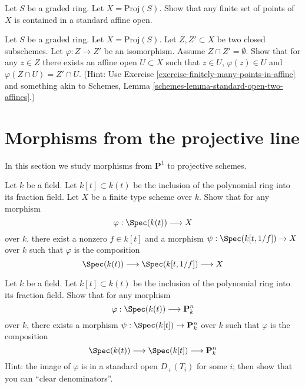 \begin{exercise}
\label{exercise-finitely-many-points-in-affine}
Let $S$ be a graded ring.
Let $X = \text{Proj}(S)$.
Show that any finite set of points of $X$ is contained in a standard
affine open.
\end{exercise}

\begin{exercise}
\label{exercise-prepare-glueing}
Let $S$ be a graded ring.
Let $X = \text{Proj}(S)$.
Let $Z, Z' \subset X$ be two closed subschemes.
Let $\varphi : Z \to Z'$ be an isomorphism.
Assume $Z \cap Z' = \emptyset$.
Show that for any $z \in Z$ there exists an affine
open $U \subset X$ such that $z \in U$, $\varphi(z) \in U$ and
$\varphi(Z \cap U) = Z' \cap U$.
(Hint: Use Exercise \ref{exercise-finitely-many-points-in-affine}
and something akin to
Schemes, Lemma \ref{schemes-lemma-standard-open-two-affines}.)
\end{exercise}







\section{Morphisms from the projective line}
\label{section-from-P1}

\noindent
In this section we study morphisms from $\mathbf{P}^1$
to projective schemes.

\begin{exercise}
\label{exercise-from-generic-point}
Let $k$ be a field. Let $k[t] \subset k(t)$ be the
inclusion of the polynomial ring into its fraction field.
Let $X$ be a finite type scheme over $k$.
Show that for any morphism
$$
\varphi : \Spec(k(t)) \longrightarrow X
$$
over $k$, there exist a nonzero $f \in k[t]$ and a morphism
$\psi : \Spec(k[t, 1/f]) \to X$ over $k$
such that $\varphi$ is the composition
$$
\Spec(k(t)) \longrightarrow \Spec(k[t, 1/f]) \longrightarrow X
$$
\end{exercise}

\begin{exercise}
\label{exercise-from-generic-point-Pn}
Let $k$ be a field. Let $k[t] \subset k(t)$ be the
inclusion of the polynomial ring into its fraction field.
Show that for any morphism
$$
\varphi : \Spec(k(t)) \longrightarrow \mathbf{P}^n_k
$$
over $k$, there exists a morphism $\psi : \Spec(k[t]) \to \mathbf{P}^n_k$
over $k$ such that $\varphi$ is the composition
$$
\Spec(k(t)) \longrightarrow \Spec(k[t]) \longrightarrow \mathbf{P}^n_k
$$
Hint: the image of $\varphi$ is in a standard open $D_+(T_i)$
for some $i$; then show that you can ``clear denominators''.
\end{exercise}

